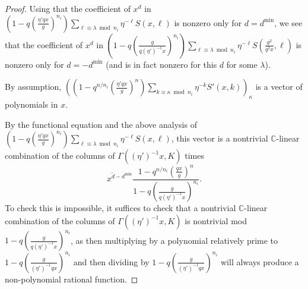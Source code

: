 \documentclass[11pt,letterpaper]{article}
\theoremstyle{definition}
\theoremstyle{remark}
\numberwithin{equation}{section}
\theoremstyle{dotless}
\renewcommand{\tilde}{\widetilde}
\begin{document}
\begin{proof}


Using that the coefficient of  $x^d $ in  $\left( 1 - q \left( \frac{ \eta' qx }{g }\right)^{n_i} \right) \sum_{\ell \equiv \lambda \bmod n_i} \eta^{-\ell}S(x,\ell) $ is nonzero only for $d = d^{\mathrm{min}}$, we see that the coefficient of $x^d$ in  $\left( 1 - q \left( \frac{g }{q (\eta')^{-1} x }\right)^{n_i} \right) \sum_{\ell \equiv \lambda \bmod n_i} \eta^{-\ell} S(\frac{g^2}{q^2x} ,\ell)$ is nonzero only for $d = -d^{\mathrm{min}}$ (and is in fact nonzero for this $d$ for some $\lambda$). 


By assumption, $ \left(\left(1- q^{n/n_i} \left( \frac{\eta' q x}{g}\right)^{n} \right)  \sum_{k \equiv \kappa \bmod n_i}  \eta^{-k} S'(x,k) \right)_\kappa $ is a vector of polynomials in $x$. 


By the functional equation and the above analysis of $\left( 1 - q  \left( \frac{ \eta' qx }{g }\right)^{n_i} \right) \sum_{\ell \equiv \lambda \bmod n_i} \eta^{-\ell}S(x,\ell)$, this vector is a nontrivial $\mathbb C$-linear combination of the columns of $\Gamma((\eta')^{-1} x,K)$ times $$ x^{ \tilde{d}- d^{\mathrm{min}} } \frac{ 1 - q^{n/n_i} \left( \frac{ qx}{g }\right)^n }{ 1 - q \left( \frac{g }{q (\eta')^{-1} x}\right)^{n_i} } .$$ To check this is impossible, it suffices to check that a nontrivial $\mathbb C$-linear combination of the columns of $\Gamma((\eta')^{-1} x,K)$ is nontrivial mod $1 - q\left( \frac{g }{q (\eta')^{-1}x}\right)^{n_i}$, as then multiplying by a polynomial relatively prime to $1 - q\left( \frac{g }{(\eta')^{-1} q x}\right)^{n_i}$ and then dividing by $1 - q\left( \frac{g }{ (\eta')^{-1}q x}\right)^{n_i}$  will always produce a non-polynomial rational function.



\end{proof}
\end{document}
